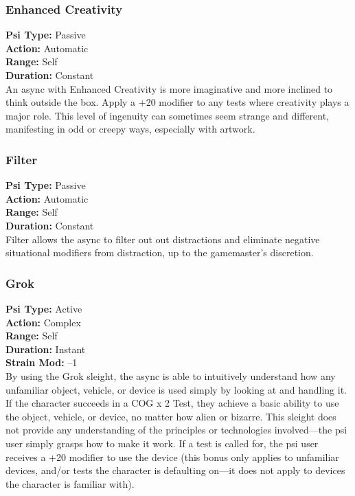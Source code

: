 \subsubsection{Enhanced Creativity} \textbf{Psi Type:} Passive \\ \textbf{Action:} Automatic \\ \textbf{Range:} Self \\ \textbf{Duration:} Constant \\ An async with Enhanced Creativity is more imaginative and more inclined to think outside the box. Apply a +20 modifier to any tests where creativity plays a major role. This level of ingenuity can sometimes seem strange and different, manifesting in odd or creepy ways, especially with artwork. 

\subsubsection{Filter} \textbf{Psi Type:} Passive \\ \textbf{Action:} Automatic \\ \textbf{Range:} Self \\ \textbf{Duration:} Constant \\ Filter allows the async to filter out out distractions and eliminate negative situational modifiers from distraction, up to the gamemaster’s discretion. 

\subsubsection{Grok} \textbf{Psi Type:} Active \\ \textbf{Action:} Complex \\ \textbf{Range:} Self \\ \textbf{Duration:} Instant \\ \textbf{Strain Mod:} –1 \\ By using the Grok sleight, the async is able to intuitively understand how any unfamiliar object, vehicle, or device is used simply by looking at and handling it. If the character succeeds in a COG x 2 Test, they achieve a basic ability to use the object, vehicle, or device, no matter how alien or bizarre. This sleight does not provide any understanding of the principles or technologies involved—the psi user simply grasps how to make it work. If a test is called for, the psi user receives a +20 modifier to use the device (this bonus only applies to unfamiliar devices, and/or tests the character is defaulting on—it does not apply to devices the character is familiar with). 


